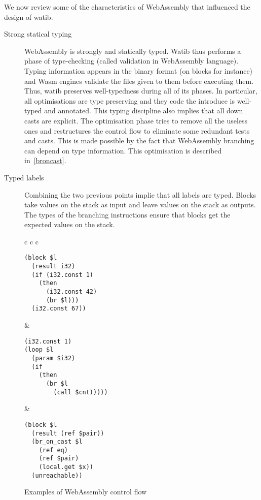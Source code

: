 \documentclass[10pt]{article}
\begin{document}
We now review some of the characteristics of WebAssembly that influenced the
design of watib.

\begin{description}
\item[Strong statical typing] WebAssembly is strongly and statically typed.
  Watib thus performs a phase of type-checking (called validation in WebAssembly
  language). Typing information appears in the binary format (on blocks for
  instance) and Wasm engines validate the files given to them before executing
  them. Thus, watib preserves well-typedness during all of its phases. In
  particular, all optimisations are type preserving and they code the introduce
  is well-typed and annotated. This typing discipline also implies that all down
  casts are explicit. The optimisation phase tries to remove all the useless
  ones and restructures the control flow to eliminate some redundant tests and
  casts. This is made possible by the fact that WebAssembly branching can depend
  on type information. This optimisation is described in~\ref{broncast}.


\item[Typed labels]
Combining the two previous points implie that all labels are typed. Blocks take
values on the stack as input and leave values on the stack as outputs. The types
of the branching instructions ensure that blocks get the expected values on the
stack.
\end{description}
\begin{figure}[h]
\centering
\begin{tabular}{c c c}
\begin{minipage}{1.8in}
\begin{verbatim}
(block $l
  (result i32)
  (if (i32.const 1)
    (then
      (i32.const 42)
      (br $l)))
  (i32.const 67))
\end{verbatim}
\end{minipage}&
\begin{minipage}{1.8in}
\begin{verbatim}
(i32.const 1)
(loop $l
  (param $i32)
  (if
    (then
      (br $l
        (call $cnt)))))
\end{verbatim}
\end{minipage}
&\begin{minipage}{1.8in}
\begin{verbatim}
(block $l
  (result (ref $pair))
  (br_on_cast $l
    (ref eq)
    (ref $pair)
    (local.get $x))
  (unreachable))
\end{verbatim}
\end{minipage}
\end{tabular}
\caption{Examples of WebAssembly control flow}\label{cf-ex}
\end{figure}
\end{document}
